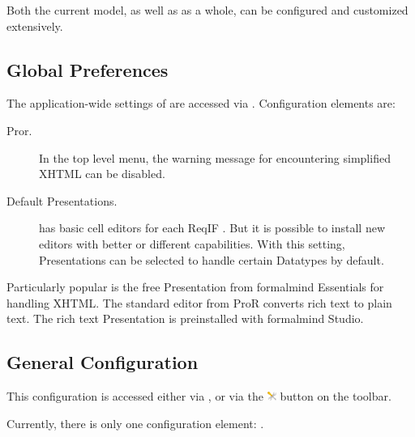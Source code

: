 Both the current model, as well as \pror{} as a whole, can be configured and customized extensively.

\subsection{Global Preferences}

The application-wide settings of \pror{} are accessed via .  Configuration elements are:

\begin{description}
\item[Pror.] In the top level menu, the warning message for encountering simplified XHTML can be disabled.
\item[Default Presentations.] \pror{} has basic cell editors for each ReqIF .  But it is possible to install new editors with better or different capabilities.  With this setting, Presentations can be selected to handle certain Datatypes by default.
\end{description}

\begin{info}
Particularly popular is the free Presentation from formalmind Essentials for handling XHTML.  The standard editor from ProR converts rich text to plain text.  The rich text Presentation is preinstalled with formalmind Studio.
\end{info}

\subsection{General Configuration}
\label{sec:general_configuration}

This configuration is accessed either via , or
via the \includegraphics[height=0.8em]{../rmf-images/ReqIFUIToolExtension.png} button on the toolbar.

Currently, there is only one configuration element: .


